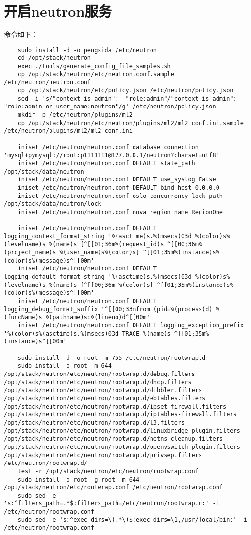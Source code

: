 \documentclass[a4paper,left=1.5cm,right=1.5cm,11pt]{article}
\begin{document}
\section{开启neutron服务}
	命令如下：
	\begin{lstlisting}
	sudo install -d -o pengsida /etc/neutron
	cd /opt/stack/neutron
	exec ./tools/generate_config_file_samples.sh
	cp /opt/stack/neutron/etc/neutron.conf.sample /etc/neutron/neutron.conf
	cp /opt/stack/neutron/etc/policy.json /etc/neutron/policy.json
	sed -i 's/"context_is_admin":  "role:admin"/"context_is_admin":  "role:admin or user_name:neutron"/g' /etc/neutron/policy.json
	mkdir -p /etc/neutron/plugins/ml2
	cp /opt/stack/neutron/etc/neutron/plugins/ml2/ml2_conf.ini.sample /etc/neutron/plugins/ml2/ml2_conf.ini
	
	iniset /etc/neutron/neutron.conf database connection 'mysql+pymysql://root:p1111111@127.0.0.1/neutron?charset=utf8'
	iniset /etc/neutron/neutron.conf DEFAULT state_path /opt/stack/data/neutron
	iniset /etc/neutron/neutron.conf DEFAULT use_syslog False
	iniset /etc/neutron/neutron.conf DEFAULT bind_host 0.0.0.0
	iniset /etc/neutron/neutron.conf oslo_concurrency lock_path /opt/stack/data/neutron/lock
	iniset /etc/neutron/neutron.conf nova region_name RegionOne

	iniset /etc/neutron/neutron.conf DEFAULT logging_context_format_string '%(asctime)s.%(msecs)03d %(color)s%(levelname)s %(name)s [^[[01;36m%(request_id)s ^[[00;36m%(project_name)s %(user_name)s%(color)s] ^[[01;35m%(instance)s%(color)s%(message)s^[[00m'
	iniset /etc/neutron/neutron.conf DEFAULT logging_default_format_string '%(asctime)s.%(msecs)03d %(color)s%(levelname)s %(name)s [^[[00;36m-%(color)s] ^[[01;35m%(instance)s%(color)s%(message)s^[[00m'
	iniset /etc/neutron/neutron.conf DEFAULT logging_debug_format_suffix '^[[00;33mfrom (pid=%(process)d) %(funcName)s %(pathname)s:%(lineno)d^[[00m'
	iniset /etc/neutron/neutron.conf DEFAULT logging_exception_prefix '%(color)s%(asctime)s.%(msecs)03d TRACE %(name)s ^[[01;35m%(instance)s^[[00m'

	sudo install -d -o root -m 755 /etc/neutron/rootwrap.d
	sudo install -o root -m 644 /opt/stack/neutron/etc/neutron/rootwrap.d/debug.filters /opt/stack/neutron/etc/neutron/rootwrap.d/dhcp.filters /opt/stack/neutron/etc/neutron/rootwrap.d/dibbler.filters /opt/stack/neutron/etc/neutron/rootwrap.d/ebtables.filters /opt/stack/neutron/etc/neutron/rootwrap.d/ipset-firewall.filters /opt/stack/neutron/etc/neutron/rootwrap.d/iptables-firewall.filters /opt/stack/neutron/etc/neutron/rootwrap.d/l3.filters /opt/stack/neutron/etc/neutron/rootwrap.d/linuxbridge-plugin.filters /opt/stack/neutron/etc/neutron/rootwrap.d/netns-cleanup.filters /opt/stack/neutron/etc/neutron/rootwrap.d/openvswitch-plugin.filters /opt/stack/neutron/etc/neutron/rootwrap.d/privsep.filters /etc/neutron/rootwrap.d/
	test -r /opt/stack/neutron/etc/neutron/rootwrap.conf
	sudo install -o root -g root -m 644 /opt/stack/neutron/etc/rootwrap.conf /etc/neutron/rootwrap.conf
	sudo sed -e 's:^filters_path=.*$:filters_path=/etc/neutron/rootwrap.d:' -i /etc/neutron/rootwrap.conf
	sudo sed -e 's:^exec_dirs=\(.*\)$:exec_dirs=\1,/usr/local/bin:' -i /etc/neutron/rootwrap.conf


\end{lstlisting}
\end{document}
